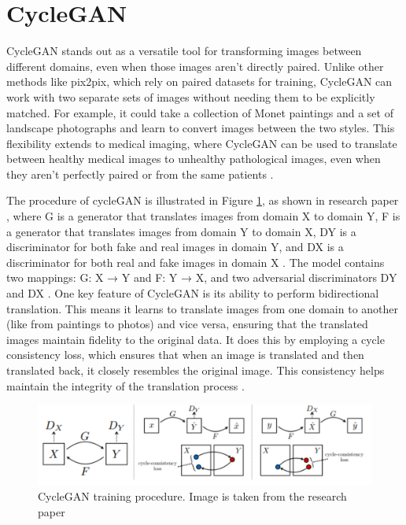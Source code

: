 \documentclass[UKenglish,12pt]{master-style}
\begin{document}
\section{CycleGAN}

CycleGAN stands out as a versatile tool for transforming images between different domains, even when those images aren't directly paired. Unlike other methods like pix2pix, which rely on paired datasets for training, CycleGAN can work with two separate sets of images without needing them to be explicitly matched. For example, it could take a collection of Monet paintings and a set of landscape photographs and learn to convert images between the two styles. This flexibility extends to medical imaging, where CycleGAN can be used to translate between healthy medical images to unhealthy pathological images, even when they aren't perfectly paired or from the same patients \cite{unpaired_horse2zebra_cyclgan} .

The procedure of cycleGAN is illustrated in Figure \ref{fig:cyclegan}, as shown in research paper \cite{unpaired_horse2zebra_cyclgan},  where G is a generator that translates images from domain X to domain Y, F is a generator that translates images from domain Y to domain X, DY is a discriminator for both fake and real images in domain Y, and DX is a discriminator for both real and fake images in domain X . The model contains two mappings: G: X → Y and F: Y → X, and two adversarial discriminators DY and DX \cite{unpaired_horse2zebra_cyclgan}. One key feature of CycleGAN is its ability to perform bidirectional translation. This means it learns to translate images from one domain to another (like from paintings to photos) and vice versa, ensuring that the translated images maintain fidelity to the original data. It does this by employing a cycle consistency loss, which ensures that when an image is translated and then translated back, it closely resembles the original image. This consistency helps maintain the integrity of the translation process \cite{unpaired_horse2zebra_cyclgan} .

\begin{figure}[htbp]
    \centering
    \includegraphics[width=1\textwidth]{Images/cyclegan.png}
    \caption{CycleGAN training procedure. Image is taken from the research paper \cite{unpaired_horse2zebra_cyclgan}}
    \label{fig:cyclegan}
\end{figure}
\end{document}
